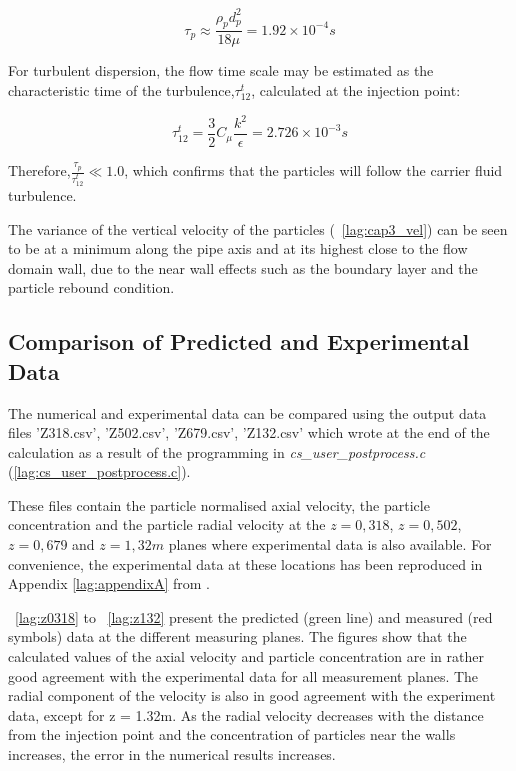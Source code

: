 \begin{equation}
\tau _p \approx \dfrac{\rho_pd_p^2}{18\mu}=1.92\times10^{-4}s
\end{equation}

For turbulent dispersion, the flow time scale may be estimated as the characteristic time of the turbulence,$\tau^t_{12}$, calculated at the injection point:

\begin{equation}
\tau^t_{12}=\dfrac{3}{2}C_\mu\dfrac{k^2}{\epsilon}=2.726\times10^{-3}s
\end{equation}

Therefore,$\frac{\tau_p}{\tau^t_{12}}\ll1.0$, which confirms that the particles will follow the carrier fluid turbulence.

The variance of the vertical velocity of the particles (\figurename~\ref{lag:cap3_vel}) can be seen to be at a minimum along the pipe axis and at its highest close to the flow domain wall, due to the near wall effects such as the boundary layer and the particle rebound condition.

\subsection{Comparison of Predicted and Experimental Data}

The numerical and experimental data can be compared using the output data files 'Z318.csv', 'Z502.csv', 'Z679.csv', 'Z132.csv' which \CS wrote at the end of the calculation as a result of the programming in \textit{cs\_user\_postprocess.c} (\ref{lag:cs_user_postprocess.c}).

These files contain the particle normalised axial velocity, the particle concentration and the particle radial velocity at the $z = 0,318$, $z = 0,502$, $z = 0,679$ and $z = 1,32m$ planes where experimental data is also available. For convenience, the experimental data at these locations has been reproduced in Appendix \ref{lag:appendixA} from \cite{Arnason}.

\figurename~\ref{lag:z0318} to \figurename~\ref{lag:z132} present the predicted (green line) and measured (red symbols) data at the different measuring planes. The figures show that the calculated values of the axial velocity and  particle concentration are in rather good agreement with the experimental data for all measurement planes.  The radial component of the velocity is also in good agreement with the experiment data, except for z = 1.32m.  As the radial velocity decreases with the distance from the injection point and the concentration of particles near the walls increases, the error in the numerical results increases.

